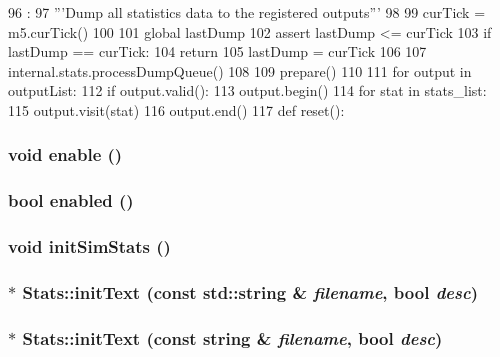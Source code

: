 \begin{DoxyCode}
96           :
97     '''Dump all statistics data to the registered outputs'''
98 
99     curTick = m5.curTick()
100 
101     global lastDump
102     assert lastDump <= curTick
103     if lastDump == curTick:
104         return
105     lastDump = curTick
106 
107     internal.stats.processDumpQueue()
108 
109     prepare()
110 
111     for output in outputList:
112         if output.valid():
113             output.begin()
114             for stat in stats_list:
115                 output.visit(stat)
116             output.end()
117 
def reset():
\end{DoxyCode}
\hypertarget{namespaceStats_a486f22824bd83c5308a0d70ffac6f758}{
\subsubsection[{enable}]{\setlength{\rightskip}{0pt plus 5cm}void enable ()}}
\label{namespaceStats_a486f22824bd83c5308a0d70ffac6f758}
\hypertarget{namespaceStats_acafb7271189f6d844921794d61cd608a}{
\subsubsection[{enabled}]{\setlength{\rightskip}{0pt plus 5cm}bool enabled ()}}
\label{namespaceStats_acafb7271189f6d844921794d61cd608a}
\hypertarget{namespaceStats_a41c3cca28455a2222dde08e12245c9bc}{
\subsubsection[{initSimStats}]{\setlength{\rightskip}{0pt plus 5cm}void initSimStats ()}}
\label{namespaceStats_a41c3cca28455a2222dde08e12245c9bc}
\hypertarget{namespaceStats_af375d792139b2c79388c158909cfd684}{
\subsubsection[{initText}]{$\ast$ Stats::initText (const std::string \& {\em filename}, \/  bool {\em desc})}}
\label{namespaceStats_af375d792139b2c79388c158909cfd684}
\hypertarget{namespaceStats_aff4528f6c0e99aac2ae6bfbba25349aa}{
\subsubsection[{initText}]{$\ast$ Stats::initText (const string \& {\em filename}, \/  bool {\em desc})}}
\label{namespaceStats_aff4528f6c0e99aac2ae6bfbba25349aa}



